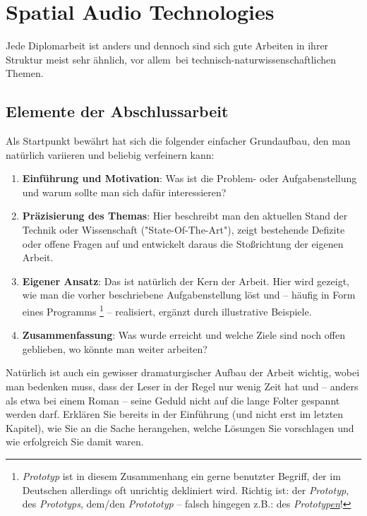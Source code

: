 \chapter{Spatial Audio Technologies}
\label{cha:Diplomschrift}

Jede Diplomarbeit ist anders und dennoch sind sich gute
Arbeiten in ihrer Struktur meist sehr ähnlich, vor allem\ bei
technisch-natur\-wissen\-schaft\-lichen Themen. 

\section{Elemente der Abschlussarbeit}

Als Startpunkt bewährt hat sich die folgender
einfacher Grundaufbau, den man natürlich vari\-ieren und beliebig
verfeinern kann:
%
\begin{enumerate}
\item \textbf{Einführung und Motivation}: Was ist die Problem- oder Aufgabenstellung und
warum sollte man sich dafür interessieren?
\item \textbf{Präzisierung des Themas}: Hier beschreibt man den aktuellen Stand der Technik
oder Wissenschaft ("State-Of-The-Art"), zeigt bestehende
Defizite oder offene Fragen auf und entwickelt daraus die
Stoßrichtung der eigenen Arbeit.
\item \textbf{Eigener Ansatz}: Das ist natürlich der Kern der Arbeit. Hier
wird gezeigt, wie man die vorher beschriebene Aufgabenstellung löst und --
häufig in Form eines Programms%
\footnote{\emph{Prototyp} ist in diesem Zusammenhang ein gerne benutzter Begriff, der im Deutschen
allerdings oft unrichtig dekliniert wird. Richtig ist: der \emph{Prototyp}, des \emph{Prototyps}, dem/den \emph{Protototyp} -- falsch hingegen z.B.: des \emph{Prototyp\underline{en}}!
} --
realisiert, ergänzt durch illustrative Beispiele.
\item \textbf{Zusammenfassung}: Was wurde erreicht und welche Ziele sind
noch offen geblieben, wo könnte man weiter arbeiten?
\end{enumerate}
%
Natürlich ist auch ein gewisser dramaturgischer Aufbau der Arbeit
wichtig, wobei man bedenken muss, dass der Leser in der Regel nur
wenig Zeit hat und -- anders als etwa bei einem Roman -- seine
Geduld nicht auf die lange Folter gespannt werden darf. Erklären
Sie bereits in der Einführung (und nicht erst im letzten Kapitel),
wie Sie an die Sache herangehen, welche Lösungen Sie vorschlagen
und wie erfolgreich Sie damit waren.

